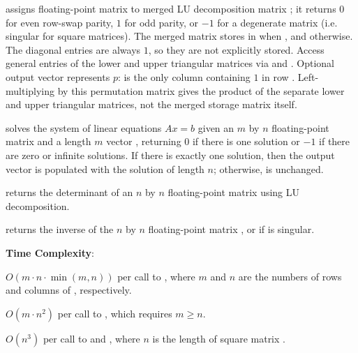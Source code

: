 \begin{compactitem}
  \item {} assigns floating-point matrix  to merged LU decomposition matrix ; it returns $0$ for even row-swap parity, $1$ for odd parity, or $-1$ for a degenerate matrix (i.e. singular for square matrices). The merged matrix stores  in  when , and  otherwise. The diagonal entries  are always $1$, so they are not explicitly stored. Access general entries of the lower and upper triangular matrices via  and . Optional output vector  represents $p$:  is the only column containing $1$ in row . Left-multiplying  by this permutation matrix gives the product of the separate lower and upper triangular matrices, not the merged storage matrix  itself.
  \item {} solves the system of linear equations $Ax = b$ given an $m$ by $n$ floating-point matrix  and a length $m$ vector , returning $0$ if there is one solution or $-1$ if there are zero or infinite solutions. If there is exactly one solution, then the output vector  is populated with the solution of length $n$; otherwise,  is unchanged.
  \item {} returns the determinant of an $n$ by $n$ floating-point matrix  using LU decomposition.
  \item {} returns the inverse of the $n$ by $n$ floating-point matrix , or  if  is singular.
\end{compactitem}

\textbf{Time Complexity}:
\begin{compactitem}
  \item $O(m \cdot n \cdot \min\left(m, n\right))$ per call to , where $m$ and $n$ are the numbers of rows and columns of , respectively.
  \item $O(m \cdot n^{2})$ per call to , which requires $m \geq n$.
  \item $O(n^{3})$ per call to  and , where $n$ is the length of square matrix .
\end{compactitem}


